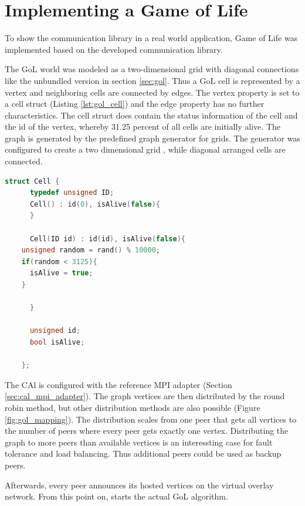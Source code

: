 \section{Implementing a Game of Life}
  
  To show the communication library in a real world 
  application, Game of Life was implemented based on the developed
  communication library.

  The GoL world was modeled as a two-dimensional grid with diagonal
  connections like the unbundled version in section
  \ref{sec:gol}. Thus a GoL cell is represented by a vertex and
  neighboring cells are connected by edges. The vertex property is set
  to a cell struct (Listing \ref{lst:gol_cell}) and the edge property
  has no further characteristics. The cell struct does contain the
  status information of the cell and the id of the vertex, whereby
  31.25 percent of all cells are initially alive.  The graph is
  generated by the predefined graph generator for grids. The generator
  was configured to create a two dimensional grid , while diagonal
  arranged cells are connected.

  \begin{lstlisting}[language=C++, label=lst:gol_cell]
    struct Cell {
      typedef unsigned ID;
      Cell() : id(0), isAlive(false){
      }

      Cell(ID id) : id(id), isAlive(false){
	unsigned random = rand() % 10000;
	if(random < 3125){
	  isAlive = true;
	}

      }
      
      unsigned id;
      bool isAlive;

    };
  \end{lstlisting}

  The CAl is configured with the reference MPI adapter (Section
  \ref{sec:cal_mpi_adapter}).  The graph vertices are then distributed
  by the round robin method, but other distribution methods
  are also possible (Figure \ref{fig:gol_mapping}).  The distribution scales from one peer that
  gets all vertices to the number of peers where every peer gets
  exactly one vertex. Distributing the graph to more peers than
  available vertices is an interessting case for fault tolerance and
  load balancing. Thus additional peers could be used as backup
  peers. 

  Afterwards, every peer announces its hosted vertices on the virtual
  overlay network. From this point on, starts the actual GoL
  algorithm.

